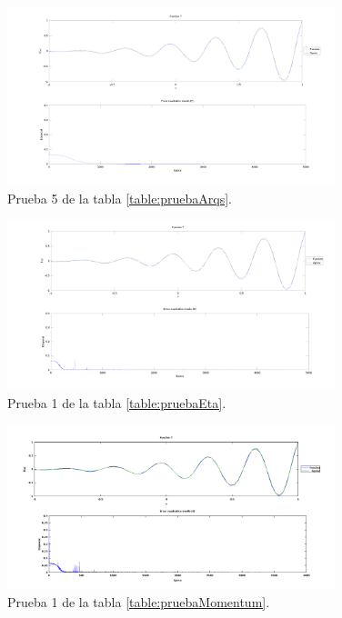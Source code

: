 \documentclass[11pt,a4paper]{article}
\begin{document}
{\begin{figure}[ht]
\centering
\includegraphics[width=0.85\textwidth]{img/PruebaRecu10.png}
\caption{\label{fig:pruebaRecu10} Prueba 5 de la tabla \ref{table:pruebaArqs}.}
\end{figure}

\begin{figure}[ht]
\centering
\includegraphics[width=0.85\textwidth]{img/PruebaRecu29.png}
\caption{\label{fig:pruebaRecu29} Prueba 1 de la tabla \ref{table:pruebaEta}.}
\end{figure}

\begin{figure}[ht]
\centering
\includegraphics[width=0.85\textwidth]{img/PruebaRecu40.png}
\caption{\label{fig:pruebaRecu40} Prueba 1 de la tabla \ref{table:pruebaMomentum}.}
\end{figure}

}
\end{document}
